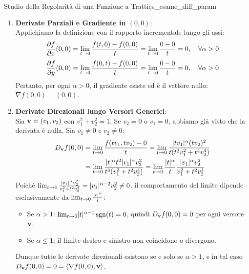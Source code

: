 \begin{esempio}{Studio della Regolarità di una Funzione a Tratti}{es_esame_diff_param}
\begin{enumerate}
    \item \textbf{Derivate Parziali e Gradiente in $(0,0)$}:\\
    Applichiamo la definizione con il rapporto incrementale lungo gli assi:
    \[
    \frac{\partial f}{\partial x}(0,0) = \lim_{t \to 0} \frac{f(t, 0) - f(0,0)}{t} = \lim_{t \to 0} \frac{0 - 0}{t} = 0, \quad \forall \alpha > 0
    \]
    \[
    \frac{\partial f}{\partial y}(0,0) = \lim_{t \to 0} \frac{f(0, t) - f(0,0)}{t} = \lim_{t \to 0} \frac{0 - 0}{t} = 0, \quad \forall \alpha > 0
    \]
    Pertanto, per ogni $\alpha > 0$, il gradiente esiste ed è il vettore nullo: $\nabla f(0,0) = (0, 0)$.

    \item \textbf{Derivate Direzionali lungo Versori Generici}:\\
    Sia $\mathbf{v} = (v_1, v_2)$ con $v_1^2 + v_2^2 = 1$. Se $v_2 = 0$ o $v_1 = 0$, abbiamo già visto che la derivata è nulla. Sia $v_1 \neq 0$ e $v_2 \neq 0$:
    \begin{align*}
    D_{\mathbf{v}} f(0,0) &= \lim_{t \to 0} \frac{f(t v_1, t v_2) - 0}{t} = \lim_{t \to 0} \frac{\lvert t v_1\rvert^\alpha (t v_2)^2}{t (t^2 v_1^2 + t^4 v_2^4)} \\
    &= \lim_{t \to 0} \frac{\lvert t\rvert^\alpha t^2 \lvert v_1\rvert^\alpha v_2^2}{t^3 (v_1^2 + t^2 v_2^4)} = \lim_{t \to 0} \frac{\lvert t\rvert^\alpha}{t} \frac{\lvert v_1\rvert^\alpha v_2^2}{v_1^2 + t^2 v_2^4}
    \end{align*}
    Poiché $\lim_{t \to 0} \frac{\lvert v_1\rvert^\alpha v_2^2}{v_1^2 + t^2 v_2^4} = \lvert v_1\rvert^{\alpha - 2} v_2^2 \neq 0$, il comportamento del limite dipende esclusivamente da $\lim_{t \to 0} \frac{\lvert t\rvert^\alpha}{t}$:
    \begin{itemize}
        \item Se $\alpha > 1$: $\lim_{t \to 0} \lvert t\rvert^{\alpha - 1} \operatorname{sgn}(t) = 0$, quindi $D_{\mathbf{v}} f(0,0) = 0$ per ogni versore $\mathbf{v}$.
        \item Se $\alpha \le 1$: il limite destro e sinistro non coincidono o divergono.
    \end{itemize}
    Dunque tutte le derivate direzionali esistono se e solo se $\alpha > 1$, e in tal caso $D_{\mathbf{v}} f(0,0) = 0 = \langle\nabla f(0,0), \mathbf{v}\rangle$.


\end{enumerate}
\end{esempio}
